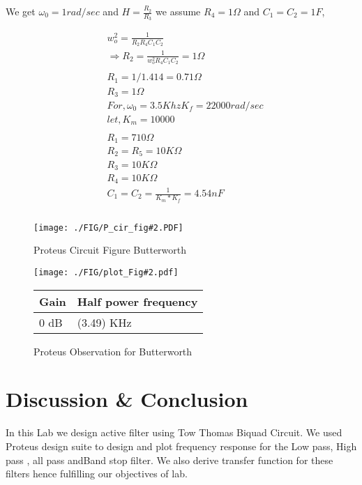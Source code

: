 \documentclass[a4paper,11pt]{article}
\newcommand\ddfrac[2]{\frac{\displaystyle #1}{\displaystyle #2}}
\newcommand{\Porcirobs}[4]{
    \begin{figure}[H] %
        \centering
        \texttt{[image: ./FIG/P\_cir\_fig\#2.PDF]}
        \caption{Proteus Circuit Figure #2}
    \end{figure}



    \begin{figure}[H]  %
        \centering
        \texttt{[image: ./FIG/plot\_Fig\#2.pdf]}
        \begin{tabular}[H]{| m{12em}| m{20em}|}
            \hline
            \rowcolor[rgb]{0.569,0.647,0.947} \textbf{Gain } & \textbf{Half power frequency} \\ \hline
            #3 dB         & (#4) KHz     \\  \hline
        \end{tabular}
        \caption{Proteus Observation for #2}
    \end{figure}
}
\begin{document}
We get $\omega_0 =1 rad/sec$ and $ H = \ddfrac{R_2}{R_3}$ we assume  $R_4 = 1\Omega$ and $C_1= C_2= 1F$,


\begin{equation*}
    \begin{aligned}
         & w_o^2= \ddfrac{1}{R_2R_4C_1C_2}                       \\
         & \Rightarrow R_2= \ddfrac{1}{w_o^2R_4C_1C_2} = 1\Omega \\\\
         & R_1 = 1/1.414 = 0.71\Omega                            \\
         & R_3= 1\Omega                                          \\
         & For,\omega_0=3.5Khz K_f= 22000 rad/sec                \\
         & let,K_m= 10000                                        \\\\
         & R_1= 710\Omega                                        \\
         & R_2= R_5= 10K\Omega                                   \\
         & R_3= 10K\Omega                                        \\
         & R_4= 10K\Omega                                        \\
         & C_1= C_2= \ddfrac{1}{K_m*K_f}= 4.54nF                 \\\\
    \end{aligned}
\end{equation*}

\Porcirobs{0.85}{Butterworth}{0}{3.49}

\section{Discussion \& Conclusion}
In this Lab we design active filter using Tow Thomas Biquad Circuit.  We used  Proteus  design suite to design and plot frequency response for the Low pass, High pass , all pass andBand stop filter. We also derive transfer function for these filters hence fulfilling our objectives of lab.
\end{document}
